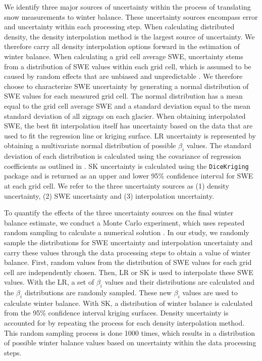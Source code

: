 \documentclass[twocolumn, letterpaper]{igs}
\begin{document}
We identify three major sources of uncertainty within the process of translating snow measurements to winter balance. These uncertainty sources encompass error and uncertainty within each processing step. When calculating distributed density, the density interpolation method is the largest source of uncertainty. We therefore carry all density interpolation options forward in the estimation of winter balance. When calculating a grid cell average SWE, uncertainty stems from a distribution of SWE values within each grid cell, which is assumed to be caused by random effects that are unbiased and unpredictable \citep{Watson2006}. We therefore choose to characterize SWE uncertainty by generating a normal distribution of SWE values for each measured grid cell. The normal distribution has a mean equal to the grid cell average SWE and a standard deviation equal to the mean standard deviation of all zigzags on each glacier. When obtaining interpolated SWE, the best fit interpolation itself has uncertainty based on the data that are used to fit the regression line or kriging surface. LR uncertainty is represented by obtaining a multivariate normal distribution of possible $\beta_i$ values. The standard deviation of each distribution is calculated using the covariance of regression coefficients as outlined in \cite{Bagos2015}. SK uncertainty is calculated using the \texttt{DiceKriging} package and is returned as an upper and lower 95\% confidence interval for SWE at each grid cell. We refer to the three uncertainty sources as (1) density uncertainty, (2) SWE uncertainty and (3) interpolation uncertainty. 

To quantify the effects of the three uncertainty sources on the final winter balance estimate, we conduct a Monte Carlo experiment, which uses repeated random sampling to calculate a numerical solution \citep{Metropolis1949}. In our study, we randomly sample the distributions for SWE uncertainty and interpolation uncertainty and carry these values through the data processing steps to obtain a value of winter balance. First, random values from the distribution of SWE values for each grid cell are independently chosen. Then, LR or SK is used to interpolate these SWE values. With the LR, a set of $\beta_i$ values and their distributions are calculated and the $\beta_i$ distributions are randomly sampled. These new $\beta_i$ values are used to calculate winter balance. With SK, a distribution of winter balance is calculated from the 95\% confidence interval kriging surfaces. Density uncertainty is accounted for by repeating the process for each density interpolation method. This random sampling process is done 1000 times, which results in a distribution of possible winter balance values based on uncertainty within the data processing steps.
\end{document}

